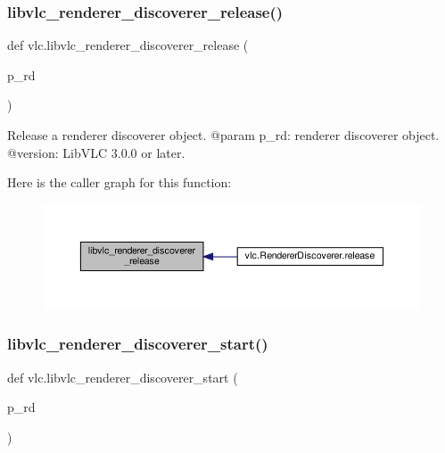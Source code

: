 \subsubsection{\texorpdfstring{libvlc\+\_\+renderer\+\_\+discoverer\+\_\+release()}{libvlc\_renderer\_discoverer\_release()}}
{\footnotesize\ttfamily def vlc.\+libvlc\+\_\+renderer\+\_\+discoverer\+\_\+release (\begin{DoxyParamCaption}\item[{}]{p\+\_\+rd }\end{DoxyParamCaption})}

\begin{DoxyVerb}Release a renderer discoverer object.
@param p_rd: renderer discoverer object.
@version: LibVLC 3.0.0 or later.
\end{DoxyVerb}
 Here is the caller graph for this function\+:
\nopagebreak
\begin{figure}[H]
\begin{center}
\leavevmode
\includegraphics[width=350pt]{namespacevlc_a81262d81bc9835dc7bdaea45c9d20b06_icgraph}
\end{center}
\end{figure}
\mbox{\label{namespacevlc_a0386aa768d1743a6462da7bd8266c7b6}} 
\subsubsection{\texorpdfstring{libvlc\+\_\+renderer\+\_\+discoverer\+\_\+start()}{libvlc\_renderer\_discoverer\_start()}}
{\footnotesize\ttfamily def vlc.\+libvlc\+\_\+renderer\+\_\+discoverer\+\_\+start (\begin{DoxyParamCaption}\item[{}]{p\+\_\+rd }\end{DoxyParamCaption})}

